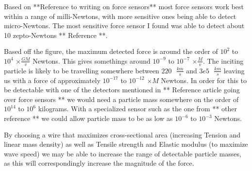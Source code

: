 \documentclass{report}
\begin{document}
Based on **Reference to writing on force sensors** most force sensors work best within a range of milli-Newtons, with more sensitive ones being able to detect micro-Newtons.
The most sensitive force sensor I found was able to detect about 10 zepto-Newtons ** Reference **. 

Based off the figure, the maximum detected force is around the order of $10^2$ to $10^4$ $\times \frac{G M}{v}$ Newtons. This gives somethings around $10^{-9}$ to $10^{-7}$ $\times \frac{M}{v}$. 
The inciting particle is likely to be travelling somewhere between $220 \text{ } \frac{km}{s}$ and $3e5 \text{ } \frac{km}{s}$ leaving us with a force of approximately $10^{-17}$ to $10^{-12}$ $\times M$ Newtons.
In order for this to be detectable with one of the detectors mentioned in ** Reference article going over force sensors ** we would need a particle mass somewhere on the order of $10^{14}$ to $10^{6}$ kilograms. 
With a specialized sensor such as the one from ** other reference ** we could allow particle mass to be as low as $10^{-6}$ to $10^{-3}$ Newtons. 

By choosing a wire that maximizes cross-sectional area (increasing Tension and linear mass density) as well as Tensile strength and Elastic modulus (to maximize wave speed) we may be able to increase the range of detectable 
particle masses, as this will correspondingly increase the magnitude of the force.
\end{document}

